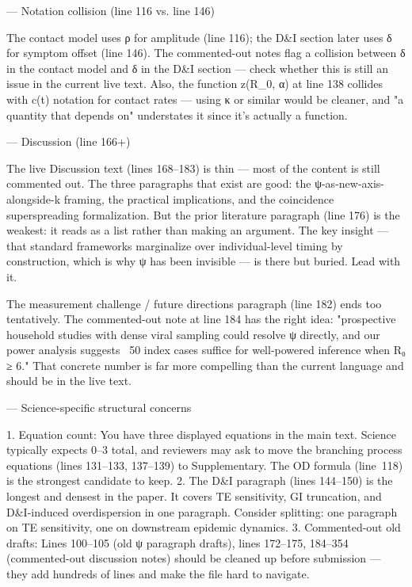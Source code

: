   ---
  Notation collision (line 116 vs. line 146)

  The contact model uses ρ for amplitude (line 116); the D&I section later uses δ for
  symptom offset (line 146). The commented-out notes flag a collision between δ in the
  contact model and δ in the D&I section — check whether this is still an issue in the
  current live text. Also, the function z(R_0, α) at line 138 collides with c(t)
  notation for contact rates — using κ or similar would be cleaner, and "a quantity
  that depends on" understates it since it's actually a function.

  ---
  Discussion (line 166+)

  The live Discussion text (lines 168–183) is thin — most of the content is still
  commented out. The three paragraphs that exist are good: the
  ψ-as-new-axis-alongside-k framing, the practical implications, and the coincidence
  superspreading formalization. But the prior literature paragraph (line 176) is the
  weakest: it reads as a list rather than making an argument. The key insight — that
  standard frameworks marginalize over individual-level timing by construction, which
  is why ψ has been invisible — is there but buried. Lead with it.

  The measurement challenge / future directions paragraph (line 182) ends too
  tentatively. The commented-out note at line 184 has the right idea: "prospective
  household studies with dense viral sampling could resolve ψ directly, and our power
  analysis suggests ~50 index cases suffice for well-powered inference when R₀ ≥ 6."
  That concrete number is far more compelling than the current language and should be
  in the live text.

  ---
  Science-specific structural concerns

  1. Equation count: You have three displayed equations in the main text. Science
  typically expects 0–3 total, and reviewers may ask to move the branching process
  equations (lines 131–133, 137–139) to Supplementary. The OD formula (line 118) is the
   strongest candidate to keep.
  2. The D&I paragraph (lines 144–150) is the longest and densest in the paper. It
  covers TE sensitivity, GI truncation, and D&I-induced overdispersion in one
  paragraph. Consider splitting: one paragraph on TE sensitivity, one on downstream
  epidemic dynamics.
  3. Commented-out old drafts: Lines 100–105 (old ψ paragraph drafts), lines 172–175,
  184–354 (commented-out discussion notes) should be cleaned up before submission —
  they add hundreds of lines and make the file hard to navigate.

